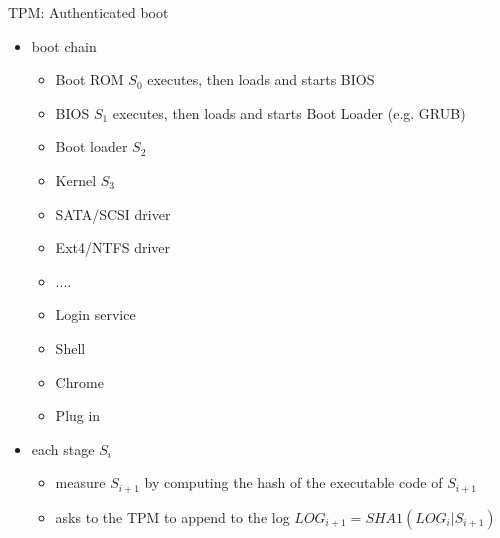\documentclass{beamer}
\begin{document}
\begin{frame}{TPM: Authenticated boot}
  \begin{itemize}
  \item boot chain
    \begin{itemize}
      \item Boot ROM $S_0$ executes, then loads and starts BIOS
      \item BIOS $S_1$ executes, then loads and starts Boot Loader
        (e.g. GRUB)
      \item Boot loader $S_2$
      \item Kernel $S_3$
      \item SATA/SCSI driver
      \item Ext4/NTFS driver
      \item ....
      \item Login service
      \item Shell
      \item Chrome
      \item Plug in
    \end{itemize}
   \item each stage $S_i$
     
     \begin{itemize}
       \item measure $S_{i+1}$ by computing the hash of the executable
         code of $S_{i+1}$
       \item asks to the TPM to append to the log $LOG_{i+1} =
         SHA1(LOG_{i} | S_{i+1})$
     \end{itemize}
  \end{itemize}
\end{frame}
\end{document}
